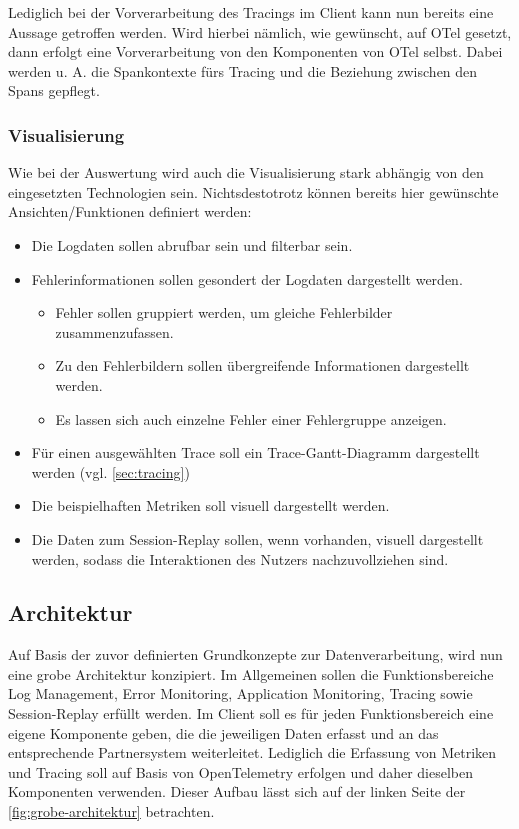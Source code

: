 	Lediglich bei der Vorverarbeitung des Tracings im Client kann nun bereits eine Aussage getroffen werden. Wird hierbei nämlich, wie gewünscht, auf OTel gesetzt, dann erfolgt eine Vorverarbeitung von den Komponenten von OTel selbst. Dabei werden u. A. die Spankontexte fürs Tracing und die Beziehung zwischen den Spans gepflegt.
	
	\subsubsection{Visualisierung}
		
	Wie bei der Auswertung wird auch die Visualisierung stark abhängig von den eingesetzten Technologien sein. Nichtsdestotrotz können bereits hier gewünschte Ansichten/Funktionen definiert werden:
	
	\begin{itemize}
		\item Die Logdaten sollen abrufbar sein und filterbar sein.
		\item Fehlerinformationen sollen gesondert der Logdaten dargestellt werden.
		\begin{itemize}
			\item Fehler sollen gruppiert werden, um gleiche Fehlerbilder zusammenzufassen.
			\item Zu den Fehlerbildern sollen übergreifende Informationen dargestellt werden.
			\item Es lassen sich auch einzelne Fehler einer Fehlergruppe anzeigen.
		\end{itemize}
		\item Für einen ausgewählten Trace soll ein Trace-Gantt-Diagramm dargestellt werden (vgl. \autoref{sec:tracing})
		\item Die beispielhaften Metriken soll visuell dargestellt werden.
		\item Die Daten zum Session-Replay sollen, wenn vorhanden, visuell dargestellt werden, sodass die Interaktionen des Nutzers nachzuvollziehen sind.
	\end{itemize}
	
	\subsection{Architektur}

	Auf Basis der zuvor definierten Grundkonzepte zur Datenverarbeitung, wird nun eine grobe Architektur konzipiert. Im Allgemeinen sollen die Funktionsbereiche Log Management, Error Monitoring, Application Monitoring, Tracing sowie Session-Replay erfüllt werden. Im Client soll es für jeden Funktionsbereich eine eigene Komponente geben, die die jeweiligen Daten erfasst und an das entsprechende Partnersystem weiterleitet. Lediglich die Erfassung von Metriken und Tracing soll auf Basis von OpenTelemetry erfolgen und daher dieselben Komponenten verwenden. Dieser Aufbau lässt sich auf der linken Seite der \autoref{fig:grobe-architektur} betrachten.
	
